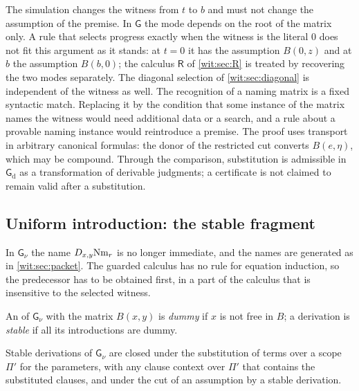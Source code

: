 \begin{remark}
\label{wit:rem:gd-qualifications}
The simulation changes the witness from $t$ to $b$ and must not change the
assumption of the premise.  In $\mathsf{G}$ the mode depends on the root of
the matrix only.  A rule that selects progress exactly when the witness is
the literal $0$ does not fit this argument as it stands: at $t=0$ it has the
assumption $B(0,z)$ and at $b$ the assumption $B(b,0)$; the calculus
$\mathsf{R}$ of \cref{wit:sec:R} is treated by recovering the two modes
separately.  The diagonal selection of \cref{wit:sec:diagonal} is
independent of the witness as well.  The recognition of a naming matrix is
a fixed syntactic match.  Replacing it by the condition that some instance
of the matrix names the witness would need additional data or a search, and
a rule about a provable naming instance would reintroduce a premise.  The
proof uses transport in arbitrary canonical formulas: the donor of the
restricted cut converts $B(e,\eta)$, which may be compound.  Through the
comparison, substitution is admissible in $\mathsf{G}_{\mathrm d}$ as a
transformation of derivable judgments; a certificate is not claimed to
remain valid after a substitution.
\end{remark}

\subsection{Uniform introduction: the stable fragment}

In $\mathsf{G}_{\nu}$ the name $D_{x,y}\mathrm{Nm}_r$ is no longer
immediate, and the names are generated as in \cref{wit:sec:packet}.  The
guarded calculus has no rule for equation induction, so the predecessor has
to be obtained first, in a part of the calculus that is insensitive to the
selected witness.

\begin{definition}
\label{wit:def:guarded-stable}
An  of $\mathsf{G}_{\nu}$ with the matrix $B(x,y)$ is
\emph{dummy} if $x$ is not free in $B$; a derivation is \emph{stable} if all
its introductions are dummy.
\end{definition}

\begin{lemma}[Stability]
\label{wit:lem:guarded-stable}
Stable derivations of $\mathsf{G}_{\nu}$ are closed under the substitution
of terms over a scope $\Pi'$ for the parameters, with any clause context
over $\Pi'$ that contains the substituted clauses, and under the cut of an
assumption by a stable derivation.
\end{lemma}

